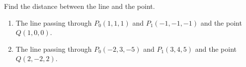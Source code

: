 Find the distance between the line and the point.

\begin{enumerate}
\item The line passing through $P_0(1,1,1)$ and $P_1(-1,-1,-1)$ and the point $Q(1,0,0)$.
\item The line passing through $P_0(-2,3,-5)$ and $P_1(3,4,5)$ and the point $Q(2,-2,2)$. 
\end{enumerate}

